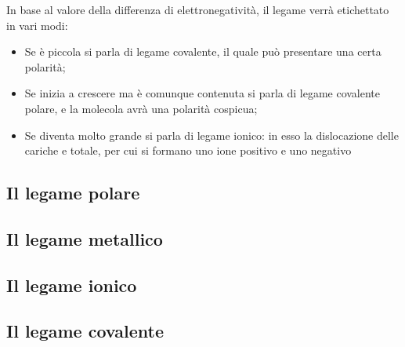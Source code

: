In base al valore della differenza di elettronegatività, il legame verrà etichettato in vari modi:
\begin{itemize}
    \item Se è piccola si parla di legame covalente, il quale può presentare una certa polarità;
    \item Se inizia a crescere ma è comunque contenuta si parla di legame covalente polare, e la molecola avrà una polarità cospicua;
    \item Se diventa molto grande si parla di legame ionico: in esso la dislocazione delle cariche e totale, per cui si formano uno ione positivo e uno negativo
\end{itemize} 
\subsection{Il legame polare}
\subsection{Il legame metallico}
\subsection{Il legame ionico}
\subsection{Il legame covalente}